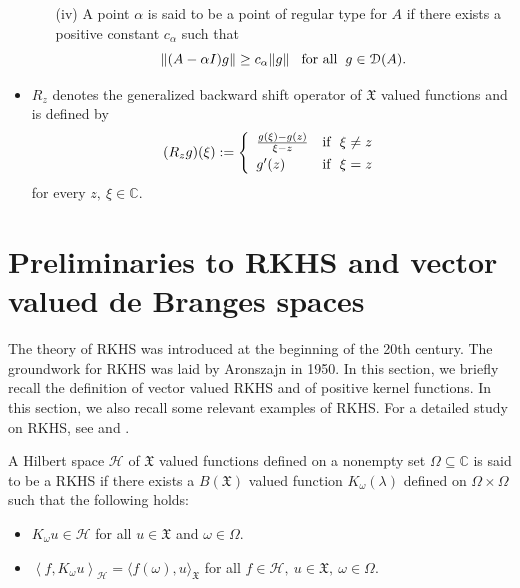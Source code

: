 \documentclass [12pt,reqno]{amsart}
\numberwithin{equation}{subsection}
\numberwithin{equation}{section}
\begin{document}
\begin{itemize}
\begin{itemize}
\item [(iv)] A point $\alpha$ is said to be a point of regular type for $A$ if there exists a positive constant $c_\alpha$ such that $$\Vert (A-\alpha I )g\Vert \geq c_\alpha \Vert g \Vert \hspace{0.3cm} \text{for all} \hspace{0.2cm} g \in \mathcal{D}(A).$$
\end{itemize}
\item $R_z$ denotes the generalized backward shift operator of $\mathfrak{X}$ valued functions and is defined by \begin{equation}
    (R_z g)(\xi) := \left\{
   \begin{array}{ll}
         \frac{g(\xi)-g(z)}{\xi-z}  & \mbox{if }~ \xi \neq z \vspace{0.1cm} \\ 
        g'(z) & \mbox{if }~ \xi = z
   \end{array} \right.
\end{equation}
for every $z,~ \xi \in \mathbb{C}$.
\end{itemize}
 
\section{Preliminaries to RKHS and vector valued de Branges spaces}
\label{Section 2}
The theory of RKHS was introduced at the beginning of the 20th century. The groundwork for RKHS was laid by Aronszajn in 1950. In this section, we briefly recall the definition of vector valued RKHS and of positive kernel functions. In this section, we also recall some relevant examples of RKHS. For a detailed study on RKHS, see \cite{Aronszajn 1950} and \cite{Paulsen}.

A Hilbert space $\mathcal{H}$ of $\mathfrak{X}$ valued functions defined on a nonempty set $\Omega \subseteq \mathbb{C}$ is said to be a RKHS if there exists a $B(\mathfrak{X})$ valued function $K_{\omega}(\lambda)$ defined on $\Omega \times \Omega$ such that the following holds:
\begin{itemize}
\item $K_{\omega}u \in \mathcal{H}$ for all $u \in \mathfrak{X}$ and $\omega \in \Omega$.
\item $\left\langle f, K_{\omega}u \right\rangle_\mathcal{H} = \langle f(\omega),u \rangle_\mathfrak{X}$ for all $f \in \mathcal{H},~ u \in \mathfrak{X},~ \omega \in \Omega$.
\end{itemize}
\end{document}
